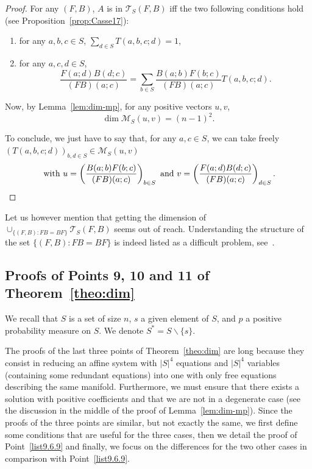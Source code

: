 \documentclass[AHL,Unicode,longabstracts]{cedram}
\newcounter{a}
\newcommand{\triang}[2]{\mathcal{T}_{#1} \left(#2 \right)}
\begin{document}
\begin{proof}
For any $(F,B)$, $A$ is in $\triang{S}{F,B}$ iff the two following conditions hold (see Proposition~\ref{prop:Casse17}):
\begin{enumerate}
\item for any $a,b,c \in S$, $\sum_{d\in S} T(a,b,c;d) = 1$,
\item for any $a,c,d \in S$,
\[
\frac{F(a;d)B(d;c)}{(FB)(a;c)} = \sum_{b\in S} \frac{B(a;b)F(b;c)}{(FB)(a;c)} T(a,b,c;d).
\]
\end{enumerate}

Now, by Lemma~\ref{lem:dim-mp}, for any positive vectors $u, v$,
\[
\dim \mathcal{M}_S(u,v) = (n-1)^2.
\]

To conclude, we just have to say that, for any $a,c\in S$, we can take freely $(T(a,b,c;d))_{b,d \in S} \in \mathcal{M}_S(u,v)$ 
\[ 
\text{ with }u= \left(\frac{B(a;b)F(b;c)}{(FB)(a;c)} \right)_{b\in S}\\
\text{ and }
v = \left(\frac{F(a;d)B(d;c)}{(FB)(a;c)}\right)_{d \in S}.\qedhere
\]
\end{proof}

Let us however mention that getting the dimension of $ \cup_{\{(F,B) : FB=BF\}} \triang{S}{F,B}$ seems out of reach. Understanding the structure of the set $\{(F,B) : FB=BF\}$ is indeed listed as a difficult problem, see~\cite{Gerstenhaber61,Guralnick92,MT55}.

\subsection{Proofs of Points 9, 10 and 11 of Theorem~\ref{theo:dim}} \label{annex:longdim}

We recall that $S$ is a set of size $n$, $s$ a given element of $S$, and $p$ a positive probability measure on $S$. We denote $S^* = S \backslash \{s\}$.

The proofs of the last three points of Theorem~\ref{theo:dim} are long because they consist in reducing an affine system with $|S|^4$ equations and $|S|^4$ variables (containing some redundant equations) into one with only free equations describing the same manifold. Furthermore, we must ensure that there exists a solution with positive coefficients and that we are not in a degenerate case (see the discussion in the middle of the proof of Lemma~\ref{lem:dim-mp}). Since the proofs of the three points are similar, but not exactly the same, we first define some conditions that are useful for the three cases, then we detail the proof of Point~\eqref{list9.6.9} and finally, we focus on the differences for the two other cases in comparison with Point~\eqref{list9.6.9}.
\end{document}
